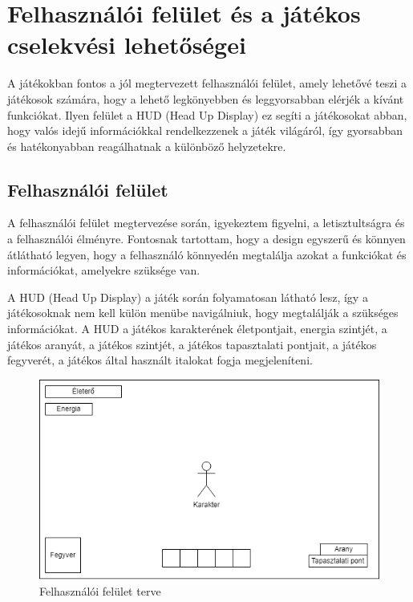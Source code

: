 \section{Felhasználói felület és a játékos cselekvési lehetőségei}

A játékokban fontos a jól megtervezett felhasználói felület, amely lehetővé teszi a játékosok számára, hogy a lehető legkönyebben és leggyorsabban elérjék a kívánt funkciókat. Ilyen felület a HUD (Head Up Display)  ez segíti a játékosokat abban, hogy valós idejű információkkal rendelkezzenek a játék világáról, így gyorsabban és hatékonyabban reagálhatnak a különböző helyzetekre.


\subsection{Felhasználói felület}

A felhasználói felület megtervezése során, igyekeztem figyelni, a letisztultságra és a felhasználói élményre. Fontosnak tartottam, hogy a design egyszerű és könnyen átlátható legyen, hogy a felhasználó könnyedén megtalálja azokat a funkciókat és információkat, amelyekre szüksége van.

A HUD (Head Up Display) a játék során folyamatosan látható lesz, így a játékosoknak nem kell külön menübe navigálniuk, hogy megtalálják a szükséges információkat. A HUD a játékos karakterének életpontjait, energia szintjét, a játékos aranyát, a játékos szintjét, a játékos tapasztalati pontjait, a játékos fegyverét, a játékos által használt italokat fogja megjeleníteni.

\begin{figure}[H]
    \centering
    \includegraphics[width=14.0truecm]{images/MS_UI.drawio.png}
    \caption{Felhasználói felület terve}
    \label{fig:Felhasználói felület}
\end{figure}

